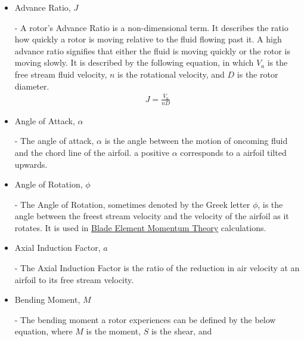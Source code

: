 \documentclass{article}
\begin{document}
\begin{itemize}
	
	\item \hypertarget{J}{Advance Ratio, $J$} - A rotor's Advance Ratio is a non-dimensional term. It describes the ratio how quickly a rotor is moving relative to the fluid flowing past it. A high advance ratio signifies that either the fluid is moving quickly or the rotor is moving slowly. It is described by the following equation, in which $V_{a}$ is the free stream fluid velocity, $n$ is the rotational velocity, and $D$ is the rotor diameter.
	\begin{equation}
	\begin{aligned}
		J = \frac{V_{a}}{n D}
	\end{aligned}
	\end{equation}
		
	\item \hypertarget{alpha}{Angle of Attack, $\alpha$} - The angle of attack, $\alpha$ is the angle between the motion of oncoming fluid and the chord line of the airfoil. a positive $\alpha$ corresponds to a airfoil tilted upwards.
	
	\item \hypertarget{phi}{Angle of Rotation, $\phi$} - The Angle of Rotation, sometimes denoted by the Greek letter $\phi$, is the angle between the freest stream velocity and the velocity of the airfoil as it rotates. It is used in \hyperlink{BEM}{Blade Element Momentum Theory} calculations.

	\item \hypertarget{a}{Axial Induction Factor, $a$} - The Axial Induction Factor is the ratio of the reduction in air velocity at an airfoil to its free stream velocity.
	
	\item \hypertarget{M}{Bending Moment, $M$} - The bending moment a rotor experiences can be defined by the below equation, where $M$ is the moment, $S$ is the shear, and 
	

\end{itemize}
\end{document}
